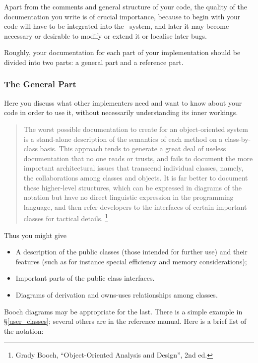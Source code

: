 Apart from the comments and general structure of your code, the
quality of the documentation you write is of crucial importance,
because to begin with your code will have to be integrated into the
\magnus\ system, and later it may become necessary or desirable to
modify or extend it or localise later bugs.

Roughly, your documentation for each part of your implementation
should be divided into two parts: a general part and a reference part.

\subsubsection{The General Part}

Here you discuss what other implementers need and want to know about
your code in order to use it, without necessarily understanding its
inner workings.

\begin{quote}
The worst possible documentation to create for an object-oriented
system is a stand-alone description of the semantics of each method on
a class-by-class basis. This approach tends to generate a great deal
of useless documentation that no one reads or trusts, and fails to
document the more important architectural issues that transcend
individual classes, namely, the collaborations among classes and
objects. It is far better to document these higher-level structures,
which can be expressed in diagrams of the notation but have no direct
linguistic expression in the programming language, and then refer
developers to the interfaces of certain important classes for tactical
details.
\footnote{Grady Booch, ``Object-Oriented Analysis and Design'', 2nd ed.}
\end{quote}

Thus you might give

	\begin{itemize}
	\item
		A description of the public classes (those intended for
		further use) and their features (such as for instance
		special efficiency and memory considerations);
	\item
		Important parts of the public class interfaces.
	\item
        Diagrams of derivation and owns-uses relationships among
        classes.
	\end{itemize}

Booch diagrams may be appropriate for the last. There is a simple
example in \S\ref{user_classes}; several others are in the reference
manual. Here is a brief list of the notation:

